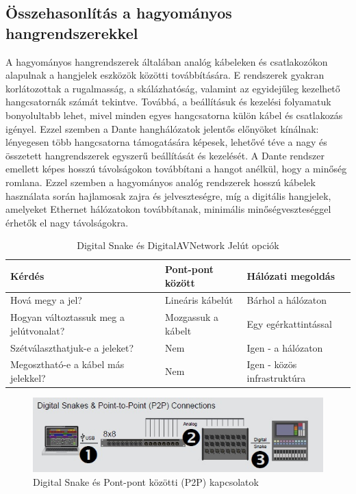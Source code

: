 \subsection{Összehasonlítás a hagyományos hangrendszerekkel}
A hagyományos hangrendszerek általában analóg kábeleken és csatlakozókon alapulnak 
a hangjelek eszközök közötti továbbítására. E rendszerek gyakran korlátozottak 
a rugalmasság, a skálázhatóság, valamint az egyidejűleg kezelhető hangcsatornák 
számát tekintve. Továbbá, a beállításuk és kezelési folyamatuk bonyolultabb lehet, 
mivel minden egyes hangcsatorna külön kábel és csatlakozás igényel. Ezzel szemben 
a Dante hanghálózatok jelentős előnyöket kínálnak: lényegesen több hangcsatorna 
támogatására képesek, lehetővé téve a nagy és összetett hangrendszerek egyszerű 
beállítását és kezelését. A Dante rendszer emellett képes hosszú távolságokon 
továbbítani a hangot anélkül, hogy a minőség romlana. Ezzel szemben a hagyományos 
analóg rendszerek hosszú kábelek használata során hajlamosak zajra és jelveszteségre, 
míg a digitális hangjelek, amelyeket Ethernet hálózatokon továbbítanak, minimális 
minőségveszteséggel érhetők el nagy távolságokra.
\begin{table}[htbp]
    \centering
    \caption{Digital Snake és DigitalAVNetwork Jelút opciók}
    \begin{tabular}{@{}lll@{}}
        \toprule
        \textbf{Kérdés} & \textbf{Pont-pont között} & \textbf{Hálózati megoldás} \\ \midrule
        Hová megy a jel? & Lineáris kábelút & Bárhol a hálózaton \\
        Hogyan változtassuk meg a jelútvonalat? & Mozgassuk a kábelt & Egy egérkattintással \\
        Szétválaszthatjuk-e a jeleket? & Nem & Igen - a hálózaton \\
        Megosztható-e a kábel más jelekkel? & Nem & Igen - közös infrastruktúra \\
        \bottomrule
    \end{tabular}
    \label{tab:digital-snake-vs-digitalavnetwork-hu}
\end{table}
\begin{figure}[H]
	\centering
	\includegraphics[width=\linewidth, keepaspectratio]{figures/dsnake-p2p.jpg}
	\caption{Digital Snake és Pont-pont közötti (P2P) kapcsolatok}
	\label {fig:dsnake-p2p}
\end{figure}
